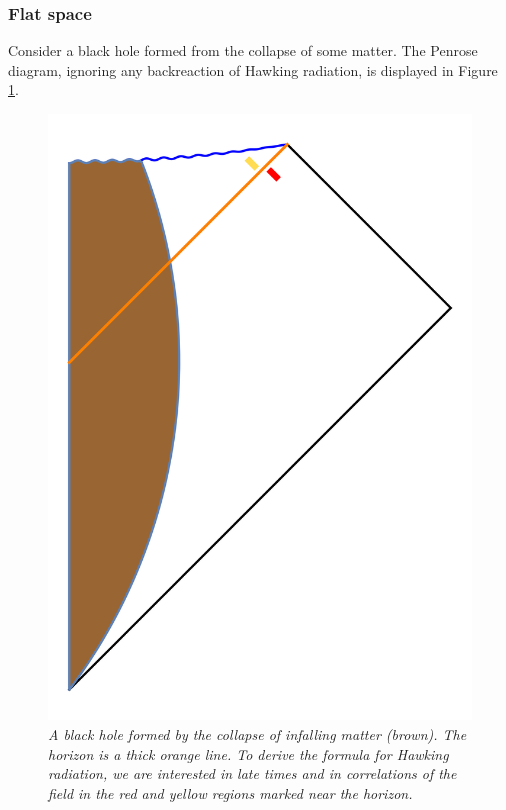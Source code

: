 \documentclass[12pt]{article}
\begin{document}
\subsubsection{Flat space \label{secflathawkingrad}}
Consider a black hole formed from the collapse of some matter. The Penrose diagram, ignoring any backreaction of Hawking radiation, is displayed in Figure \ref{naivepenrose}. 
\begin{figure}[!ht]
\begin{center}
\includegraphics[height=0.4\textheight]{naivepenrose.png}
\caption{\em A black hole formed by the collapse of infalling matter (brown). The horizon is a thick orange line. To derive the formula for Hawking radiation, we are interested in late times and in correlations of the field in the red and yellow regions marked near the horizon. \label{naivepenrose}}
\end{center}
\end{figure}
\end{document}
